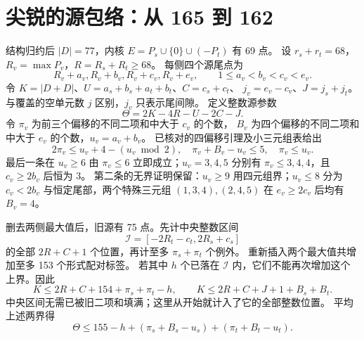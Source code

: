 \documentclass[11pt,a4paper]{article}
\begin{document}
\section{尖锐的源包络：从 165 到 162}\label{sec:source}
结构归约后 $|D|=77$，内核 $E=P_s\cup\{0\}\cup(-P_t)$ 有 69 点。
设 $r_s+r_t=68$，$R_v=\max P_v$，$R=R_s+R_t\ge68$。
每侧四个源尾点为
\[R_v+a_v, R_v+b_v, R_v+c_v, R_v+e_v,
\qquad 1\le a_v<b_v<c_v<e_v.\]
令 $K=|D+D|$、$U=a_s+b_s+a_t+b_t$、$C=c_s+c_t$、
$j_v=e_v-c_v$、$J=j_s+j_t$。与覆盖的空单元数 $j$ 区别，$j_v$ 只表示尾间隙。
定义整数源参数
\[\Theta=2K-4R-U-2C-J.\]
令 $\pi_v$ 为前三个偏移的不同二项和中大于 $c_v$ 的个数，
$B_v$ 为四个偏移的不同二项和中大于 $e_v$ 的个数，$u_v=a_v+b_v$。
已核对的四偏移引理及小三元组表给出
\begin{equation}\label{eq:fringe}
2\pi_v\le u_v+4-(u_v\bmod2),\quad
\pi_v+B_v-u_v\le5,\quad \pi_v\le u_v.
\end{equation}
最后一条在 $u_v\ge6$ 由 $\pi_v\le6$ 立即成立；$u_v=3,4,5$ 分别有
$\pi_v\le3,4,4$，且 $c_v\ge2b_v$ 后恒为 3。
第二条的无界证明保留：$u_v\ge9$ 用四元组界；$u_v\le8$ 分为
$c_v<2b_v$ 与恒定尾部，两个特殊三元组 $(1,3,4),(2,4,5)$ 在 $e_v\ge2c_v$ 后均有 $B_v=4$。

删去两侧最大值后，旧源有 75 点。先计中央整数区间
\[\mathcal I=[-2R_t-c_t,2R_s+c_s]\]
的全部 $2R+C+1$ 个位置，再计至多 $\pi_s+\pi_t$ 个例外。
重新插入两个最大值共增加至多 153 个形式配对标签。
若其中 $h$ 个已落在 $\mathcal I$ 内，它们不能再次增加这个上界。因此
\[
K\le2R+C+154+\pi_s+\pi_t-h,\qquad
K\le2R+C+J+1+B_s+B_t.
\]
中央区间无需已被旧二项和填满；这里从开始就计入了它的全部整数位置。
平均上述两界得
\begin{equation}\label{eq:average}
\Theta\le155-h+(\pi_s+B_s-u_s)+(\pi_t+B_t-u_t).
\end{equation}
\end{document}
